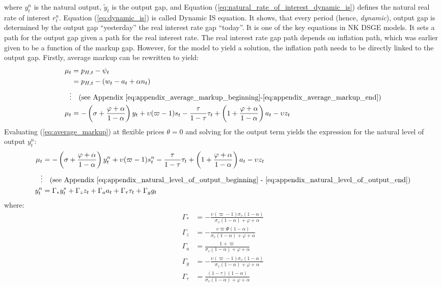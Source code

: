 where $y^n_{t}$ is the natural output, $\tilde{y}_t$ is the output gap, and Equation (\ref{eq:natural_rate_of_interest_dynamic_is}) defines the natural real rate of interest $r_t^n$. Equation (\ref{eq:dynamic_is}) is called Dynamic IS equation. It shows, that every period (hence, \textit{dynamic}), output gap is determined by the output gap ``yesterday'' the real interest rate gap ``today''. It is one of the key equations in NK DSGE models. It sets a path for the output gap given a path for the real interest rate. The real interest rate gap path depends on inflation path, which was earlier given to be a function of the markup gap. However, for the model to yield a solution, the inflation path needs to be directly linked to the output gap. Firstly, average markup can be rewritten to yield:
\begin{align}
    \mu_t &= p_{H,t} - \psi_t \\
     &= p_{H,t} - (w_t - a_t + \alpha n_t) \nonumber \\
    \vdots & \quad \text{(see Appendix \ref{eq:appendix_average_markup_beginning}-\ref{eq:appendix_average_markup_end})} \nonumber \\
    \mu_t &= -\left(\sigma + \frac{\varphi + \alpha}{1-\alpha}\right)y_t + \upsilon (\varpi - 1) s_t - \frac{\tau}{1-\tau}\tau_t  + \left(1 + \frac{\varphi + \alpha}{1-\alpha}\right)a_t - \upsilon z_t \label{eq:average_markup}
\end{align}
Evaluating (\ref{eq:average_markup}) at flexible prices $\theta=0$ and solving for the output term yields the expression for the natural level of output $y_t^n$:
\begin{align}
    \mu_t &= -\left(\sigma + \frac{\varphi + \alpha}{1-\alpha}\right)y^n_t + \upsilon (\varpi - 1) s^n_t - \frac{\tau}{1-\tau}\tau_t  + \left(1 + \frac{\varphi + \alpha}{1-\alpha}\right)a_t - \upsilon z_t \label{eq:average_markup_flexible_prices}\\
    \vdots & \quad \text{(see Appendix \ref{eq:appendix_natural_level_of_output_beginning} - \ref{eq:appendix_natural_level_of_output_end})} \nonumber \\
    y^n_t &= \Gamma_* y^*_t + \Gamma_z z_t + \Gamma_a a_t + \Gamma_\tau \tau_t + \Gamma_g g_t \label{eq:natural_output}
\end{align}
where:
\begin{align}
    \Gamma_* &= -\frac{\upsilon(\varpi - 1)\sigma_\upsilon(1-\alpha)}{\sigma_\upsilon (1-\alpha) + \varphi + \alpha} \\
    \Gamma_z &= -\frac{\upsilon \varpi \Phi (1-\alpha)}{\sigma_\upsilon (1-\alpha) + \varphi + \alpha} \\
    \Gamma_a &= \frac{1+\varpi}{\sigma_\upsilon (1-\alpha) + \varphi + \alpha} \\
    \Gamma_g &= -\frac{\upsilon(\varpi - 1)\sigma_\upsilon(1-\alpha)}{\sigma_\upsilon (1-\alpha) + \varphi + \alpha}\\
    \Gamma_\tau &= \frac{(1-\tau)(1-\alpha)}{\sigma_\upsilon (1-\alpha) + \varphi + \alpha}
\end{align}
